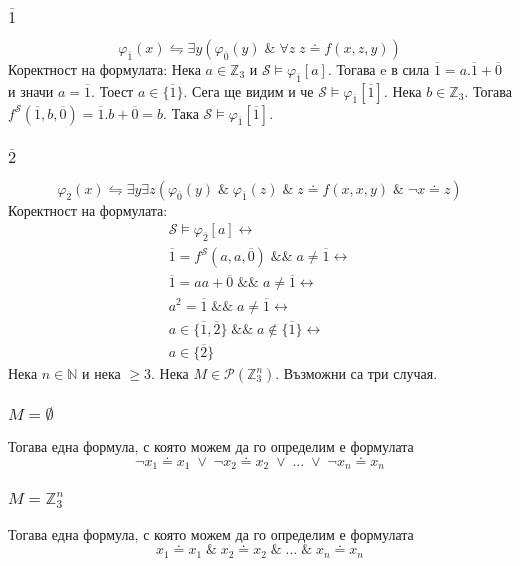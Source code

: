 \documentclass[17pt]{extarticle}
\begin{document}
\subsubsection{\(\overline 1\)}
\[\varphi_{\overline 1}(x) \leftrightharpoons \exists y(\varphi_{\overline 0}(y) \;\&\; \forall z \; z \doteq f(x, z, y))\]
Коректност на формулата:
Нека \(a \in \mathbb{Z}_3\) и \(\mathcal S \models \varphi_{\overline 1}[a]\). Тогава e в сила \(\overline 1 = a.\overline 1 + \overline 0\) и значи \(a = \overline 1\). Тоест \(a \in \{\overline 1\}\). Сега ще видим и че \(\mathcal S \models \varphi_{\overline 1}[\overline 1]\). Нека \(b \in \mathbb{Z}_3\).
Тогава \(f^{\mathcal S}(\overline 1, b, \overline 0) = \overline{1}.b + \overline{0} = b\). Така \(\mathcal S \models \varphi_{\overline 1}[\overline 1]\).

\subsubsection{\(\overline 2\)}
\[\varphi_{\overline 2}(x) \leftrightharpoons \exists y \exists z (\varphi_{\overline 0}(y) \;\&\; \varphi_{\overline 1}(z) \;\&\; z \doteq f(x, x, y) \;\&\; \lnot x \doteq z)\]
Коректност на формулата:
\begin{align*}
    \mathcal S \models \varphi_{\overline 2}[a] \longleftrightarrow \\
    \overline 1 = f^{\mathcal S}(a, a, \overline 0) \;\&\&\; a \neq \overline 1 \longleftrightarrow \\
    \overline 1 = aa + \overline 0 \;\&\&\; a \neq \overline 1 \longleftrightarrow \\
    a^2 = \overline 1 \;\&\&\; a \neq \overline 1 \longleftrightarrow \\
    a \in \{\overline 1, \overline 2\} \;\&\&\; a \notin \{\overline 1\} \longleftrightarrow \\
    a \in \{\overline 2\}
\end{align*}
Нека \(n \in \mathbb N\) и нека \(\geq 3\). Нека \(M \in \mathcal{P}(\mathbb{Z}_3^n)\).
Възможни са три случая.

\subsubsection{\(M = \emptyset\)}
Тогава една формула, с която можем да го определим е формулата
\[\lnot x_1 \doteq x_1 \;\lor\; \lnot x_2 \doteq x_2 \;\lor\; \dots \;\lor\; \lnot x_n \doteq x_n\]

\subsubsection{\(M = \mathbb{Z}_3^n\)}
Тогава една формула, с която можем да го определим е формулата
\[x_1 \doteq x_1 \;\&\; x_2 \doteq x_2 \;\&\; \dots \;\&\; x_n \doteq x_n\]
\end{document}

